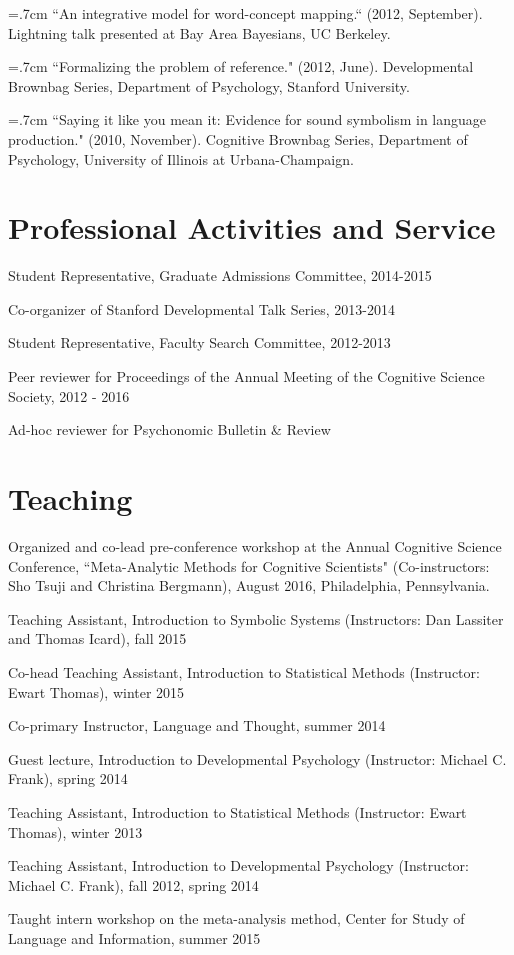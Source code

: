 \documentclass[letterpaper]{article}
\renewenvironment{itemize}{
  \begin{list}{}{
    \setlength{\leftmargin}{1.5em}
  }
}{
  \end{list}
}
\begin{document}
 \hangindent=.7cm ``An integrative model for word-concept mapping.`` (2012, September). Lightning talk presented at Bay Area Bayesians, UC Berkeley.

\hangindent=.7cm ``Formalizing the problem of reference."  (2012, June). Developmental Brownbag Series, Department of Psychology, Stanford University.

\hangindent=.7cm ``Saying it like you mean it: Evidence for sound symbolism in language production." (2010, November). Cognitive Brownbag Series, Department of Psychology, University of Illinois at Urbana-Champaign.

 
 
 \singlespacing

\section*{Professional Activities and Service}
\begin{itemize}
\item Student Representative, Graduate Admissions Committee, 2014-2015
\item  Co-organizer of Stanford Developmental Talk Series, 2013-2014
\item Student Representative, Faculty Search Committee, 2012-2013
\item Peer reviewer for Proceedings of the Annual Meeting of the Cognitive Science Society, 2012 -  2016
\item Ad-hoc reviewer for Psychonomic Bulletin \& Review 
\end{itemize}

\section*{Teaching}
\begin{itemize}
\item Organized and co-lead pre-conference workshop at the Annual Cognitive Science Conference, ``Meta-Analytic Methods for Cognitive Scientists" (Co-instructors: Sho Tsuji and Christina Bergmann), August 2016, Philadelphia, Pennsylvania. 
\item Teaching Assistant, Introduction to Symbolic Systems (Instructors: Dan Lassiter and Thomas Icard), fall 2015
\item Co-head Teaching Assistant, Introduction to Statistical Methods (Instructor: Ewart Thomas), winter 2015
\item Co-primary Instructor, Language and Thought, summer 2014
\item Guest lecture, Introduction to Developmental Psychology (Instructor: Michael C. Frank), spring 2014
\item Teaching Assistant, Introduction to Statistical Methods (Instructor: Ewart Thomas), winter 2013
\item Teaching Assistant, Introduction to Developmental Psychology (Instructor: Michael C. Frank), fall 2012, spring 2014
\item Taught intern workshop on the meta-analysis method, Center for Study of Language and Information, summer 2015

\end{itemize}
\end{document}
